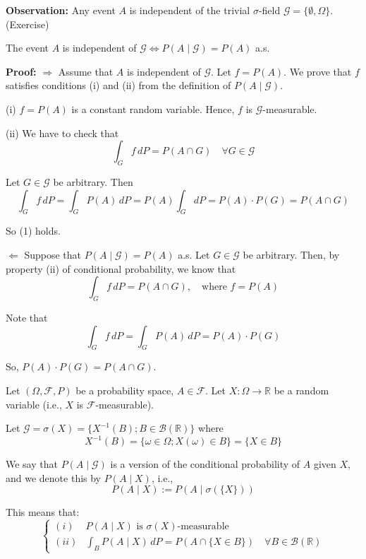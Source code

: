 \textbf{Observation:} Any event \(A\) is independent of the trivial \(\sigma\)-field \(\mathcal{G} = \{\emptyset, \Omega\}\). (Exercise)

\begin{example}
The event \(A\) is independent of \(\mathcal{G} \iff P(A \mid \mathcal{G}) = P(A) \) a.s.

\textbf{Proof:} \(\Rightarrow\) Assume that \(A\) is independent of \(\mathcal{G}\). Let \(f = P(A)\). We prove that \(f\) satisfies conditions (i) and (ii) from the definition of \(P(A \mid \mathcal{G})\).

(i) \(f = P(A)\) is a constant random variable. Hence, \(f\) is \(\mathcal{G}\)-measurable.

(ii) We have to check that
\[
\int_G f \, dP = P(A \cap G) \quad \forall G \in \mathcal{G} \tag{1}
\]

Let \(G \in \mathcal{G}\) be arbitrary. Then
\[
\int_G f \, dP = \int_G P(A) \, dP = P(A) \int_G dP = P(A) \cdot P(G) = P(A \cap G)
\]

So (1) holds.

\(\Leftarrow\) Suppose that \(P(A \mid \mathcal{G}) = P(A)\) a.s. Let \(G \in \mathcal{G}\) be arbitrary. Then, by property (ii) of conditional probability, we know that
\[
\int_G f \, dP = P(A \cap G), \quad \text{where } f = P(A)
\]

Note that
\[
\int_G f \, dP = \int_G P(A) \, dP = P(A) \cdot P(G)
\]

So, \(P(A) \cdot P(G) = P(A \cap G)\).
\end{example}


\begin{definition}
    
Let \((\Omega, \mathcal{F}, P)\) be a probability space, \(A \in \mathcal{F}\). Let \(X: \Omega \rightarrow \mathbb{R}\) be a random variable (i.e., \(X\) is \(\mathcal{F}\)-measurable). 

Let \(\mathcal{G} = \sigma(X) = \{ X^{-1}(B); B \in \mathcal{B}(\mathbb{R}) \}\) where 
\[ 
X^{-1}(B) = \{ \omega \in \Omega; X(\omega) \in B \} = \{X \in B\}
\]

We say that \(P(A \mid \mathcal{G})\) is a version of the conditional probability of \(A\) given \(X\), and we denote this by \(P(A \mid X)\), i.e.,
\[
P(A \mid X) := P\left(A \mid \sigma(\{X\})\right)
\]

This means that:
\[
\begin{cases} 
(i) & P(A \mid X) \text{ is } \sigma(X)\text{-measurable} \\
(ii) & \int_B P(A \mid X) \, dP = P(A \cap \{X \in B\}) \quad \forall B \in \mathcal{B}(\mathbb{R})
\end{cases}
\]
\end{definition}




